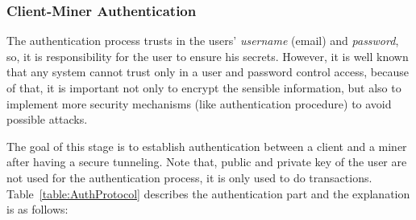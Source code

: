 
\subsubsection{Client-Miner Authentication}
\label{ssec:SecAuth}


The authentication process trusts in the users' \textit{username} 
(email) and \textit{password}, so, it is responsibility for the user 
to ensure his secrets. However, it is well known that any system 
cannot trust only in a user and password control access, because of that, 
it is important not only to encrypt the sensible information, but also
to implement more security mechanisms (like authentication procedure) to 
avoid possible attacks.

The goal of this stage is to establish authentication between a client and 
a miner after having a secure tunneling. Note that, public and private key
of the user are not used for the authentication process, it is only used to
do transactions. Table~\ref{table:AuthProtocol} 
describes the authentication part and the explanation is as follows:

